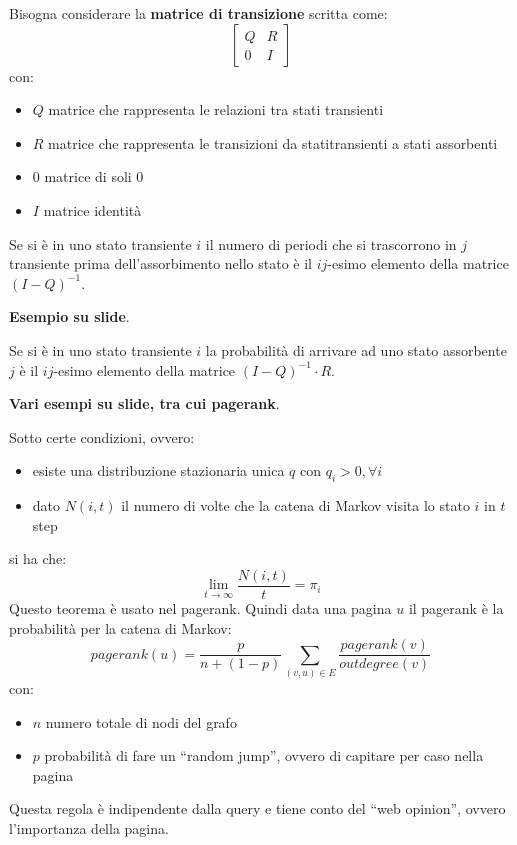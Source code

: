 \documentclass[a4paper,12pt, oneside]{book}
\begin{document}
\begin{definizione}
  Bisogna considerare la \textbf{matrice di transizione} scritta come:
  \[
    \left[
      \begin{matrix}
        Q & R\\
        0 & I
      \end{matrix}
    \right]
  \]
  \newpage
  con:
  \begin{itemize}
    \item $Q$ matrice che rappresenta le relazioni tra stati transienti
    \item $R$ matrice che rappresenta le transizioni da  statitransienti a stati
    assorbenti
    \item $0$ matrice di soli 0
    \item $I$ matrice identità
\end{itemize}
\end{definizione}
\begin{definizione}
  Se si è in uno stato transiente $i$ il numero di periodi che si trascorrono
  in $j$ transiente prima dell'assorbimento nello stato è il $ij$-esimo
  elemento della matrice $(I-Q)^{-1}$.
\end{definizione}
\textbf{Esempio su slide}.
\begin{definizione}
    Se si è in uno stato transiente $i$ la probabilità di arrivare ad uno stato
    assorbente $j$ è il $ij$-esimo elemento della matrice $(I-Q)^{-1}\cdot R$.
\end{definizione}
\textbf{Vari esempi su slide, tra cui pagerank}.
\begin{teorema}
  Sotto certe condizioni, ovvero:
  \begin{itemize}
    \item esiste una distribuzione stazionaria unica $q$ con $q_i>0,\forall i$
    \item dato $N(i,t)$ il numero di volte che la catena di Markov visita lo
    stato $i$ in $t$ step
  \end{itemize}
  si ha che:
  \[\lim_{t\to\infty}\frac{N(i,t)}{t}=\pi_i\]
  Questo teorema è usato nel pagerank. Quindi data una pagina $u$ il pagerank è
  la probabilità per la catena di Markov:
  \[pagerank(u)=\frac{p}{n+(1-p)}\sum_{(v,u)\in
      E}\frac{pagerank(v)}{outdegree(v)}\]
  con:
  \begin{itemize}
    \item $n$ numero totale di nodi del grafo
    \item $p$ probabilità di fare un ``random jump'', ovvero di capitare per
    caso nella pagina
  \end{itemize}
  Questa regola è indipendente dalla query e tiene conto del ``web opinion'',
  ovvero l'importanza della pagina.
\end{teorema}
\end{document}
